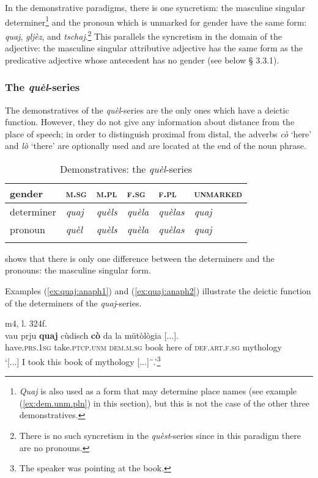 In the demonstrative paradigms, there is one syncretism: the masculine singular determiner\footnote{\textit{Quaj} is also used as a form that may determine place names (see example (\ref{ex:dem.unm.pln}) in this section), but this is not the case of the other three demonstratives.} and the pronoun which is unmarked for gender have the same form: \textit{quaj}, \textit{gljèz}, and \textit{tschaj}.\footnote{There is no such syncretism in the \textit{quèst}-series since in this paradigm there are no pronouns.} This parallels the syncretism in the domain of the adjective: the masculine singular attributive adjective has the same form as the predicative adjective whose antecedent has no gender (see below § 3.3.1).

\subsubsection{The \textit{quèl}-series}

The demonstratives of the \textit{quèl}-series are the only ones which have a deictic function. However, they do not give any information about distance from the place of speech; in order to distinguish proximal from distal, the adverbs \textit{cò} `here' and \textit{lò} `there' are optionally used and are located at the end of the noun phrase.

\begin{table}
\caption{Demonstratives: the \textit{quèl}-series}
\label{demquel}
 \begin{tabular}{llllll}
  \lsptoprule
   gender         & \textsc{m.sg} & \textsc{m.pl} & \textsc{f.sg} & \textsc{f.pl} & \textsc{unmarked}\\
  \midrule
  determiner  & \textit{quaj} &  \textit{quèls}  & \textit{quèla}  & \textit{quèlas} & \textit{quaj}\\
  pronoun  & \textit{quèl} & \textit{quèls} & \textit{quèla} & \textit{quèlas} & \textit{quaj}\\
  \lspbottomrule
 \end{tabular}
\end{table}

 shows that there is only one difference between the determiners and the pronouns: the masculine singular form. 


Examples (\ref{ex:quaj:anaph1}) and (\ref{ex:quaj:anaph2}) illustrate the deictic function of the determiners of the \textit{quaj}-series.

\ea
\label{ex:quaj:anaph1}
 {m4, l. 324f.}\\
\gll [...] vau prju \textbf{quaj} cùdisch \textbf{cò} da la mütòlògia [...].\\
{} have.\textsc{prs.1sg} take.\textsc{ptcp.unm} \textsc{dem.m.sg} book here of \textsc{def.art.f.sg} mythology\\
\glt `[...] I took this book of mythology [...]¨.'\footnote{The speaker was pointing at the book.}
\z


